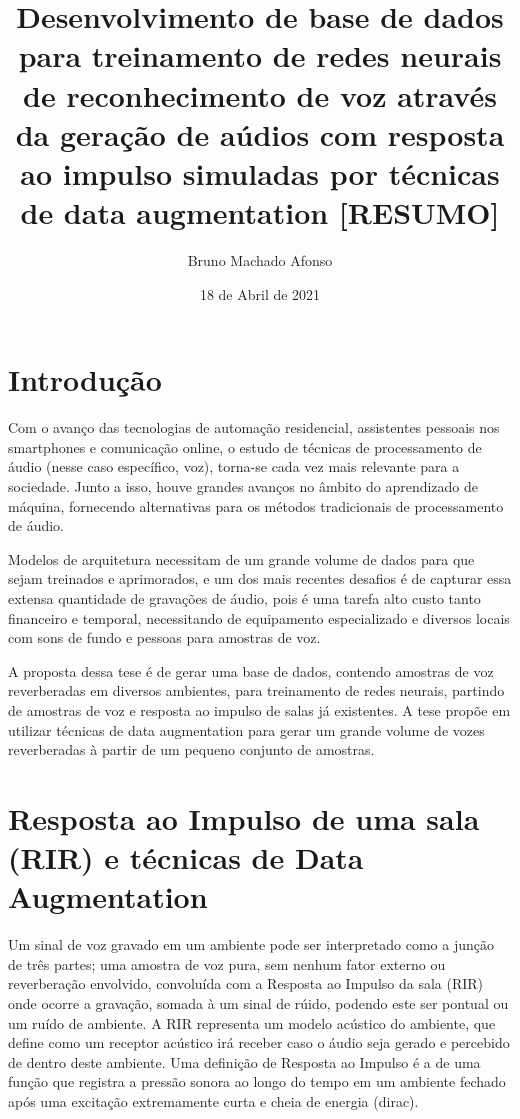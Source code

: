 \documentclass{article}
\title{Desenvolvimento de base de dados para treinamento de redes neurais de reconhecimento de voz
através da geração de aúdios com resposta ao impulso simuladas por técnicas de data augmentation [RESUMO]}
\author{Bruno Machado Afonso}
\date{18 de Abril de 2021}
\begin{document}
\maketitle

\section{Introdução}

Com o avanço das tecnologias de automação residencial, assistentes pessoais nos
smartphones e comunicação online, o estudo de técnicas de processamento de áudio (nesse 
caso específico, voz), torna-se cada vez mais relevante para a sociedade.
Junto a isso, houve grandes avanços no âmbito do aprendizado de máquina, fornecendo
alternativas para os métodos tradicionais de processamento de áudio.

Modelos de arquitetura necessitam de um grande volume de dados para que sejam 
treinados e aprimorados, e um dos mais recentes desafios é de capturar essa extensa 
quantidade de gravações de áudio, pois é uma tarefa alto custo tanto financeiro e 
temporal, necessitando de equipamento especializado e diversos locais com sons de fundo
e pessoas para amostras de voz.

A proposta dessa tese é de gerar uma base de dados, contendo amostras de voz reverberadas
em diversos ambientes, para treinamento de redes neurais, 
partindo de amostras de voz e resposta ao impulso de salas já existentes.
A tese propõe em utilizar técnicas de data augmentation para gerar um grande volume
de vozes reverberadas à partir de um pequeno conjunto de amostras.

\hfill

\section{Resposta ao Impulso de uma sala (RIR) e técnicas de Data Augmentation}

Um sinal de voz gravado em um ambiente pode ser interpretado como a junção de três
partes; uma amostra de voz pura, sem nenhum fator externo ou reverberação envolvido,
convoluída com a Resposta ao Impulso da sala (RIR) onde ocorre a gravação, somada à
um sinal de rúido, podendo este ser pontual ou um ruído de ambiente.
A RIR representa um modelo acústico do ambiente, que define como um receptor acústico
irá receber caso o áudio seja gerado e percebido de dentro deste ambiente.
Uma definição de Resposta ao Impulso é a de uma função que registra a pressão sonora 
ao longo do tempo em um ambiente fechado após uma excitação extremamente curta e 
cheia de energia (dirac).
\end{document}
